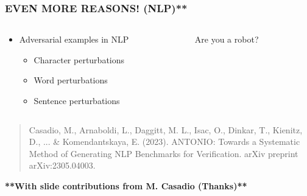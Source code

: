 \documentclass[t,compress,aspectratio=169]{beamer}
\begin{document}
\begin{frame}
\frametitle{EVEN MORE REASONS! (NLP)**}
\begin{columns}[c]
    \begin{column}{.5\textwidth}
    \Large

        \begin{itemize}
        \Large
            \item {Adversarial examples in NLP}
            \begin{itemize}
                    \Large

                \item Character perturbations
                \item Word perturbations
                \item Sentence perturbations
            \end{itemize}
        \end{itemize}
        
    \end{column}
    \begin{column}{.5\textwidth}
    \Large

    \begin{center}
        \textcolor{aisecpurple}{Are you a robot?}\\
    \end{center}
    \end{column}
\end{columns}
\vfill
	\begin{quote}
		\tiny Casadio, M., {{Arnaboldi, L.}}, Daggitt, M. L., Isac, O., Dinkar, T., Kienitz, D., ... \& Komendantskaya, E. (2023). ANTONIO: Towards a Systematic Method of Generating NLP Benchmarks for Verification. arXiv preprint arXiv:2305.04003.
		
	\end{quote}
 \vfill
 \tiny {\textbf{**With slide contributions from M. Casadio (Thanks)**}}
\end{frame}
\end{document}
